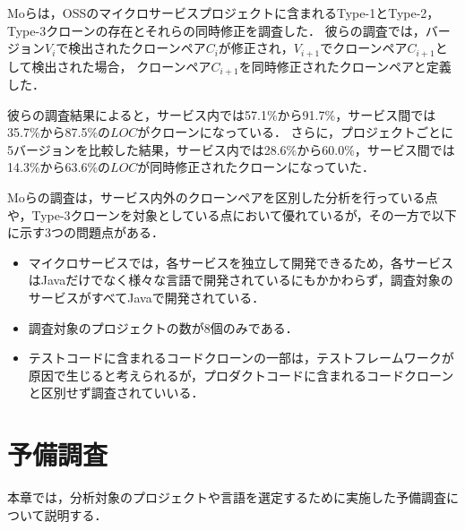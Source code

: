 \documentclass[T,J]{fose}
\begin{document}
Moらは，OSSのマイクロサービスプロジェクトに含まれるType-1とType-2，Type-3クローンの存在とそれらの同時修正を調査した\cite{mo2021existence}．
彼らの調査では，バージョン$V_i$で検出されたクローンペア$C_i$が修正され，$V_{i+1}$でクローンペア$C_{i+1}$として検出された場合，
クローンペア$C_{i+1}$を同時修正されたクローンペアと定義した．

彼らの調査結果によると，サービス内では57.1\%から91.7\%，サービス間では35.7\%から87.5\%の$LOC$がクローンになっている．
さらに，プロジェクトごとに5バージョンを比較した結果，サービス内では28.6\%から60.0\%，サービス間では14.3\%から63.6\%の$LOC$が同時修正されたクローンになっていた．

Moらの調査は，サービス内外のクローンペアを区別した分析を行っている点や，Type-3クローンを対象としている点において優れているが，その一方で以下に示す3つの問題点がある．
\begin{itemize}
    \item マイクロサービスでは，各サービスを独立して開発できるため，各サービスはJavaだけでなく様々な言語で開発されているにもかかわらず，調査対象のサービスがすべてJavaで開発されている．
    \item 調査対象のプロジェクトの数が8個のみである．
    \item テストコードに含まれるコードクローンの一部は，テストフレームワークが原因で生じると考えられるが，プロダクトコードに含まれるコードクローンと区別せず調査されていいる．
\end{itemize}

\section{予備調査} \label{sec:preliminary}
本章では，分析対象のプロジェクトや言語を選定するために実施した予備調査について説明する．
\end{document}
